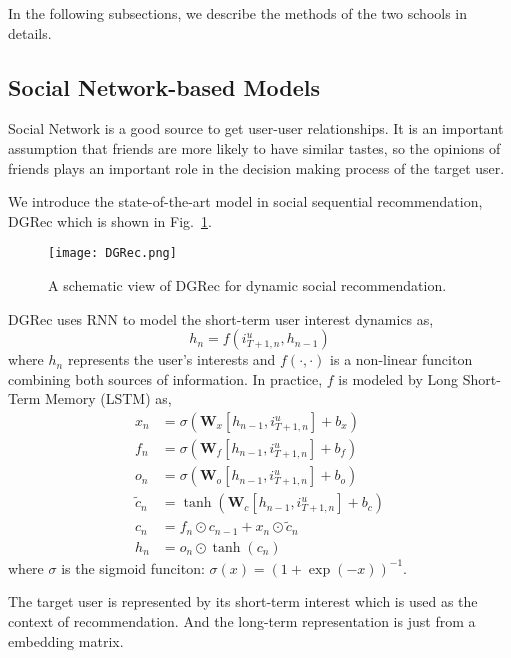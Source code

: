 In the following subsections, we describe the methods of the two schools in details.

\subsection{Social Network-based Models}
Social Network is a good source to get user-user relationships. It is an important
assumption that friends are more likely to have similar tastes, so the opinions
of friends plays an important role in the decision making process of the 
target user.

We introduce the state-of-the-art model in social sequential recommendation,
DGRec \cite{song2019session} which is shown in Fig.~\ref{fig:dgrec}.
\begin{figure}[h]
	\centering
	\texttt{[image: DGRec.png]}
	\caption{A schematic view of DGRec for dynamic social recommendation.}
	\label{fig:dgrec}
	\vspace{-10pt}
\end{figure}
DGRec uses RNN to model the short-term user interest dynamics as,
\begin{equation}
    h_{n}=f\left(i_{T+1, n}^{u}, h_{n-1}\right)
\end{equation}
where $h_n$ represents the user's interests and $f(\cdot, \cdot)$ is a non-linear
funciton combining both sources of information. In practice, $f$ is modeled
by Long Short-Term Memory (LSTM) as,
\begin{equation}
\begin{aligned} x_{n} &=\sigma\left(\mathbf{W}_{x}\left[h_{n-1}, i_{T+1, n}^{u}\right]+b_{x}\right) \\ f_{n} &=\sigma\left(\mathbf{W}_{f}\left[h_{n-1}, i_{T+1, n}^{u}\right]+b_{f}\right) \\ o_{n} &=\sigma\left(\mathbf{W}_{o}\left[h_{n-1}, i_{T+1, n}^{u}\right]+b_{o}\right) \\ \tilde{c}_{n} &=\tanh \left(\mathbf{W}_{c}\left[h_{n-1}, i_{T+1, n}^{u}\right]+b_{c}\right) \\ c_{n} &=f_{n} \odot c_{n-1}+x_{n} \odot \tilde{c}_{n} \\ h_{n} &=o_{n} \odot \tanh \left(c_{n}\right) \end{aligned}
\end{equation}
where $\sigma$ is the sigmoid funciton: $\sigma(x)=(1+\exp (-x))^{-1}$.

The target user is represented by its short-term interest which is used as 
the context of recommendation. And the long-term representation is just from
a embedding matrix.

